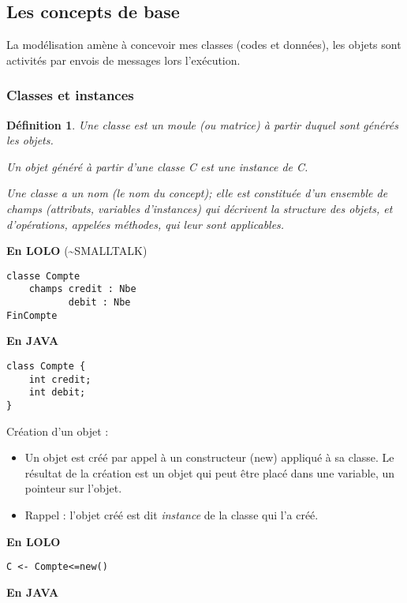\documentclass{article}
\newtheorem{definition}{Définition}
\begin{document}
\subsection{Les concepts de base}

La modélisation amène à concevoir mes classes (codes et données), 
les objets sont activités par envois de messages lors l'exécution. 

\subsubsection{Classes et instances}

\begin{definition}
	Une classe est un moule (ou matrice) à partir duquel sont générés 
	les objets.

	Un objet généré à partir d'une classe C est une 
	instance de C.

	Une classe a un nom (le nom du concept); elle est constituée d'un 
	ensemble de champs (attributs, variables d'instances) qui décrivent 
	la structure des objets, et d'opérations, appelées méthodes,
	qui leur sont applicables. 
\end{definition}

\textbf{En LOLO} (\sim SMALLTALK)

\begin{verbatim}
classe Compte
	champs credit : Nbe
		   debit : Nbe
FinCompte
\end{verbatim}

\textbf{En JAVA} 

\begin{verbatim}
class Compte {
	int credit;
	int debit;
}
\end{verbatim}

Création d'un objet :
\begin{itemize}
	\item Un objet est créé par appel à un constructeur (new) appliqué à sa 
		classe. Le résultat de la création est un objet qui peut être placé 
		dans une variable, un pointeur sur l'objet.
	 \item Rappel : l'objet créé est dit \emph{instance} de la classe qui
		 l'a créé.
\end{itemize}

\textbf{En LOLO}

\begin{verbatim}
C <- Compte<=new()
\end{verbatim}

\textbf{En JAVA} 
\end{document}
